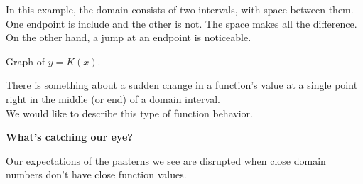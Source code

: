\documentclass{ximera}
\begin{document}
In this example, the domain consists of two intervals, with space between them. One endpoint is include and the other is not.  The space makes all the difference.  \\







On the other hand, a jump at an endpoint is noticeable.




Graph of $y = K(x)$.

\begin{image}
\end{image}





There is something about a sudden change in a function's value at a single point right in the middle (or end) of a domain interval.\\

We would like to describe this type of function behavior. \\



\begin{idea}  \textbf{\textcolor{purple!85!blue}{What's catching our eye?}}


Our expectations of the paaterns we see are disrupted when close domain numbers don't have close function values.


\end{idea}
\end{document}
